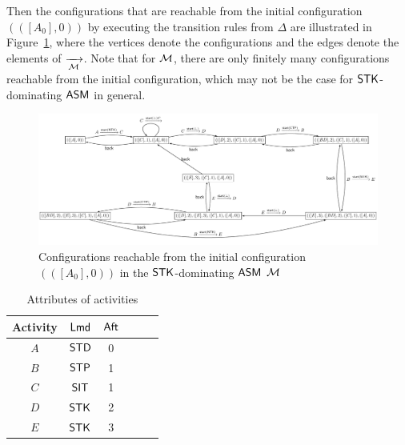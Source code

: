 \begin{example}
	Then the configurations that are reachable from the initial configuration $(([A_0], 0))$ by executing the transition rules from $\Delta$ are illustrated in Figure~\ref{stk-asm-example}, where the vertices denote the configurations and the edges denote the elements of $\xrightarrow[{\mathcal{M} }]{}$. 
	Note that for ${\mathcal{M} }$, there are only finitely many configurations reachable from the initial configuration, which may not be the case for $\mathsf{STK}$-dominating $\textsf{ASM}$ in general.  
	\begin{figure}
			\centering
			\includegraphics[scale = 0.5]{stk-asm-example.pdf}
			\caption{Configurations reachable from the initial configuration $(([A_0], 0))$ in the $\mathsf{STK}$-dominating $\textsf{ASM}$ ${\mathcal{M} }$}
		\label{stk-asm-example}
	\end{figure}

\begin{table}[htbp]
	\begin{center}
	\begin{tabular}{|c|c|c|c|c|c|}
	\hline
	Activity & ${\sf Lmd}$ & ${\sf Aft}$\\
	\hline
	$A$ & $\mathsf{STD}$ & 0\\
	\hline
	$B$ & $\mathsf{STP}$ & 1 \\
	\hline
	$C$ & $\mathsf{SIT}$ & 1 \\
	\hline
	$D$ & $\mathsf{STK}$ & 2 \\
	\hline
	$E$ & $\mathsf{STK}$ & 3 \\
	\hline
	\end{tabular}
	\caption{Attributes of activities}
	\label{tab-attribute-stk}
	\end{center}
\end{table} 


\end{example}


